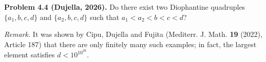 \textbf{Problem 4.4 (Dujella, 2026).} Do there exist two Diophantine quadruples $\{a_1,b,c,d\}$ and $\{a_2,b,c,d\}$ such that $a_1<a_2<b<c<d$?

\medskip

\textit{Remark.} It was shown by Cipu, Dujella and Fujita (Mediterr. J. Math. \textbf{19} (2022), Article 187) that there are only finitely many such examples; in fact, the largest element satisfies $d < 10^{10^{26}}$.
